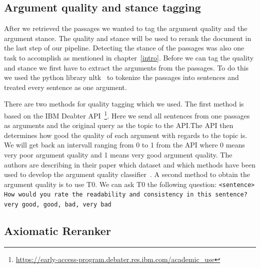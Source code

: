    \subsection{Argument quality and stance tagging}
        After we retrieved the passages we wanted to tag the argument quality and the argument stance. The quality and stance  will be used to rerank the document in the last step of our pipeline. Detecting the stance of the passages was also one task to accomplish as mentioned in chapter~\ref{intro}. Before we can tag the quality and stance we first have to extract the arguments from the passages. To do this we used the python library nltk~\cite{BirdLK2009} to tokenize the passages into sentences and treated every sentence as one argument.\par
        There are two methods for quality tagging which we used. The first method is based on the IBM Deabter API~\footnote{\url{https://early-access-program.debater.res.ibm.com/academic_use}}. Here we send all sentences from one passages as arguments and the original query as the topic to the API.The API then determines how good the quality of each argument with regards to the topic is. We will get back an intervall ranging from 0 to 1 from the API where 0 means very poor argument quality and 1 means very good argument quality. The authors \citeauthor{ToledoG2019} are describing in their paper which dataset and which methods have been used to develop the argument quality classifier~\cite{ToledoG2019}. A second method to obtain the argument quality is to use T0. We can ask T0 the following question: \texttt{<sentence> How would you rate the readability and
        consistency in this sentence? very good, good, bad, very bad}  
    \subsection{Axiomatic Reranker}